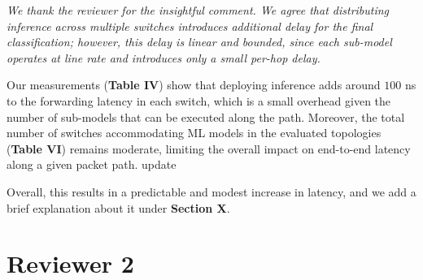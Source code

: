 \documentclass[10pt,compsoc,onecolumn,a4paper]{IEEEtran}
\begin{document}
\begin{itemize}
\vspace*{4pt}
{\it 
We thank the reviewer for the insightful comment.
We agree that distributing inference across multiple switches introduces additional delay for the final classification; however, this delay is linear and bounded, since each sub-model operates at line rate and introduces only a small per-hop delay. 

Our measurements (\textbf{Table IV}) show that deploying inference adds around $100$ ns to the forwarding latency in each switch, which is a small overhead given the number of sub-models that can be executed along the path. Moreover, the total number of switches accommodating ML models in the evaluated topologies (\textbf{Table VI}) remains moderate, limiting the overall impact on end-to-end latency along a given packet path. {\color{red}update}

Overall, this results in a predictable and modest increase in latency, and we add a brief explanation about it under \textbf{Section X}.
}

\end{itemize}

\section*{Reviewer 2}

\end{document}
